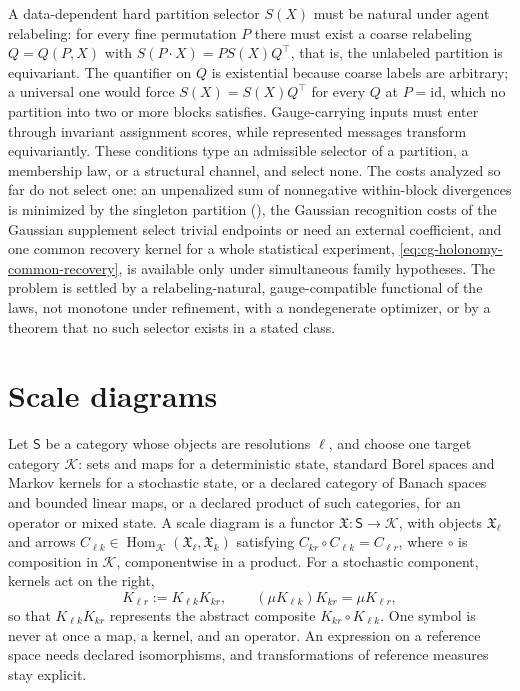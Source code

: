 \label{eq:cg-partition-naturality}
A data-dependent hard partition selector $S(X)$ must be natural under agent relabeling: for every
fine permutation $P$ there must exist a coarse relabeling $Q=Q(P,X)$ with
$S(P\cdot X)=PS(X)Q^\top$, that is, the unlabeled partition is equivariant. The quantifier on $Q$
is existential because coarse labels are arbitrary; a universal one would force $S(X)=S(X)Q^\top$
for every $Q$ at $P=\mathrm{id}$, which no partition into two or more blocks satisfies.
Gauge-carrying inputs must enter through invariant assignment scores, while represented messages
transform equivariantly. These conditions type an admissible selector of a partition, a membership
law, or a structural channel, and select none. The costs analyzed so far do not select one: an
unpenalized sum of nonnegative within-block divergences is minimized by the singleton partition
(), the Gaussian recognition costs of the Gaussian supplement
select trivial endpoints or need an external coefficient, and one common recovery kernel for a
whole statistical experiment, \eqref{eq:cg-holonomy-common-recovery}, is available only under
simultaneous family hypotheses. The problem is settled by a relabeling-natural, gauge-compatible
functional of the laws, not monotone under refinement, with a nondegenerate optimizer, or by a
theorem that no such selector exists in a stated class.

\section{Scale diagrams}
\label{sec:rg-scale-category}

\label{eq:rg-scale-diagram}
Let $\mathsf S$ be a category whose objects are resolutions $\ell$, and choose one target category
$\mathscr K$: sets and maps for a deterministic state, standard Borel spaces and Markov kernels for
a stochastic state, or a declared category of Banach spaces and bounded linear maps, or a declared
product of such categories, for an operator or mixed state. A scale diagram is a functor
$\mathfrak X:\mathsf S\to\mathscr K$, with objects $\mathfrak X_\ell$ and arrows
$C_{\ell k}\in\operatorname{Hom}_{\mathscr K}(\mathfrak X_\ell,\mathfrak X_k)$ satisfying
$C_{kr}\circ C_{\ell k}=C_{\ell r}$, where $\circ$ is composition in $\mathscr K$, componentwise in
a product. For a stochastic component, kernels act on the right,
\begin{equation}
K_{\ell r}:=K_{\ell k}K_{kr},
\qquad
(\mu K_{\ell k})K_{kr}=\mu K_{\ell r},
\label{eq:rg-right-acting-kernel-composition}
\end{equation}
so that $K_{\ell k}K_{kr}$ represents the abstract composite $K_{kr}\circ K_{\ell k}$. One symbol is
never at once a map, a kernel, and an operator. An expression on a reference space needs declared
isomorphisms, and transformations of reference measures stay explicit.

